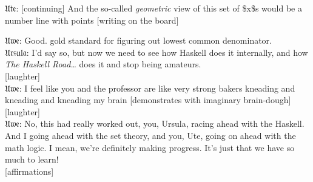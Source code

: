 \documentclass[american]{article}
\begin{document}
𝔘𝔱𝔢: [continuing] And
the so-called \emph{geometric} view of this set of \$x\$s would be a number
line with points [writing on the board]


\begin{center}

\end{center}



\begin{center}

\end{center}

\begin{center}

\end{center}


\begin{center}

\end{center}


\begin{center}

\end{center}


\begin{center}

\end{center}


\begin{center}

\end{center}

𝔘𝔴𝔢: Good. gold
standard for figuring out lowest common denominator. \\[0pt]
𝔘𝔯𝔰𝔲𝔩𝔞: I'd say so, but
now we need to see how Haskell does it internally, and how \emph{The
Haskell Road\ldots{}} does it and stop being amateurs. \\[0pt]
[laughter] \\[0pt]

𝔘𝔴𝔢: I feel like you
and the professor are like very strong bakers kneading and kneading
and kneading my brain [demonstrates with imaginary brain-dough] \\[0pt]
[laughter] \\[0pt]
𝔘𝔴𝔢: No, this had
really worked out, you, Ursula, racing ahead with the Haskell. And I
going ahead with the set theory, and you, Ute, going on ahead with the
math logic. I mean, we're definitely making progress. It's just that
we have so much to learn! \\[0pt]
[affirmations]
\end{document}
